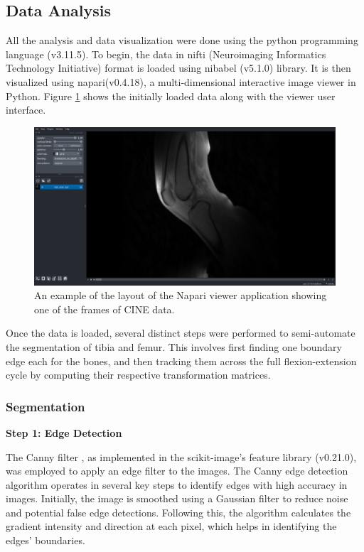 \documentclass{micro-econ-thesis}
\begin{document}
\subsection{Data Analysis}
All the analysis and data visualization were done using the python programming language (v3.11.5). To begin, the data in nifti (Neuroimaging Informatics Technology Initiative) format is loaded using nibabel (v5.1.0) library. It is then visualized using napari(v0.4.18), a multi-dimensional interactive image viewer in Python. Figure \ref{fig:step1viewer} shows the initially loaded data along with the viewer user interface. 
\begin{figure}[H]
	\centering
	\includegraphics[width=0.7\linewidth]{step_1_viewer}
	\caption{An example of the layout of the Napari viewer application showing one of the frames of CINE data.}
	\label{fig:step1viewer}
\end{figure}

Once the data is loaded, several distinct steps were performed to semi-automate the segmentation of tibia and femur. This involves first finding one boundary edge each for the bones, and then tracking them across the full flexion-extension cycle by computing their respective transformation matrices. 
 
\subsubsection{Segmentation}
\textbf{Step 1: Edge Detection}

The Canny filter \parencite{canny_computational_1986}, as implemented in the scikit-image's feature library (v0.21.0), was employed to apply an edge filter to the images. The Canny edge detection algorithm operates in several key steps to identify edges with high accuracy in images. Initially, the image is smoothed using a Gaussian filter to reduce noise and potential false edge detections. Following this, the algorithm calculates the gradient intensity and direction at each pixel, which helps in identifying the edges' boundaries.
\end{document}

